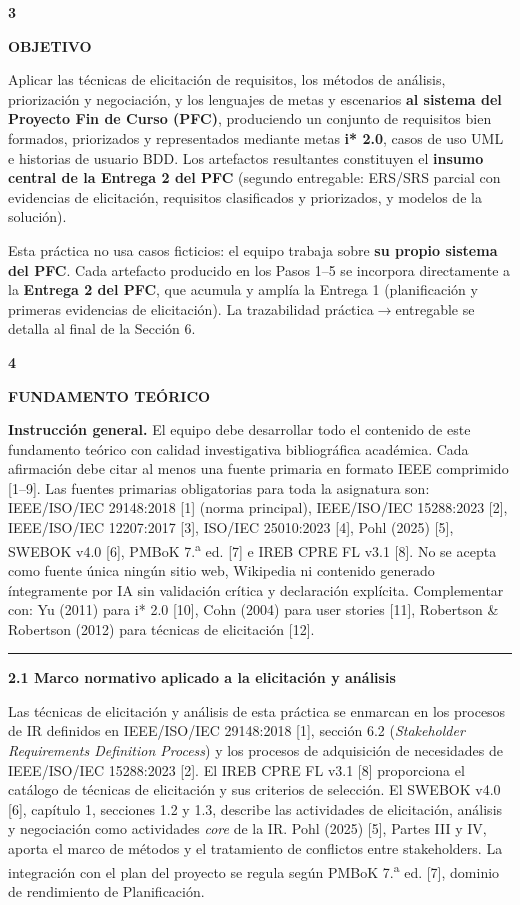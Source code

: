 \documentclass[11pt,a4paper]{article}
\newcommand{\secband}[2]{%
  \par\vspace{9pt}\noindent
  {\setlength{\fboxsep}{0pt}%
   \colorbox{secdark}{\parbox[c][20pt][c]{0.05\textwidth}{\centering\textbf{\color{white}\small #1}}}%
   \colorbox{secblue}{\parbox[c][20pt][c]{0.95\textwidth}{\hspace{8pt}\textbf{\color{white}\small #2}}}%
  }\par\vspace{5pt}}
\newcommand{\submark}[1]{\par\vspace{4pt}\noindent
  {\color{secblue}\rule[-1pt]{3.5pt}{12pt}}\hspace{6pt}\textbf{\color{secdark}#1}\par\vspace{2pt}}
\begin{document}
\secband{3}{OBJETIVO}
Aplicar las técnicas de elicitación de requisitos, los métodos de análisis, priorización y negociación, y los lenguajes de metas y escenarios \textbf{al sistema del Proyecto Fin de Curso (PFC)}, produciendo un conjunto de requisitos bien formados, priorizados y representados mediante metas \textbf{i* 2.0}, casos de uso UML e historias de usuario BDD. Los artefactos resultantes constituyen el \textbf{insumo central de la Entrega 2 del PFC} (segundo entregable: ERS/SRS parcial con evidencias de elicitación, requisitos clasificados y priorizados, y modelos de la solución).

\begin{notabox}[title={Vínculo con el Proyecto Fin de Curso — Entrega 2}]
\small Esta práctica no usa casos ficticios: el equipo trabaja sobre \textbf{su propio sistema del PFC}. Cada artefacto producido en los Pasos 1–5 se incorpora directamente a la \textbf{Entrega 2 del PFC}, que acumula y amplía la Entrega 1 (planificación y primeras evidencias de elicitación). La trazabilidad práctica$\rightarrow$entregable se detalla al final de la Sección 6.
\end{notabox}

\secband{4}{FUNDAMENTO TEÓRICO}
\textbf{Instrucción general.} El equipo debe desarrollar todo el contenido de este fundamento teórico con calidad investigativa bibliográfica académica. Cada afirmación debe citar al menos una fuente primaria en formato IEEE comprimido [1–9]. Las fuentes primarias obligatorias para toda la asignatura son: IEEE/ISO/IEC 29148:2018 [1] (norma principal), IEEE/ISO/IEC 15288:2023 [2], IEEE/ISO/IEC 12207:2017 [3], ISO/IEC 25010:2023 [4], Pohl (2025) [5], SWEBOK v4.0 [6], PMBoK 7.\textsuperscript{a} ed. [7] e IREB CPRE FL v3.1 [8]. No se acepta como fuente única ningún sitio web, Wikipedia ni contenido generado íntegramente por IA sin validación crítica y declaración explícita. Complementar con: Yu (2011) para i* 2.0 [10], Cohn (2004) para user stories [11], Robertson \& Robertson (2012) para técnicas de elicitación [12].

\submark{2.1 Marco normativo aplicado a la elicitación y análisis}
Las técnicas de elicitación y análisis de esta práctica se enmarcan en los procesos de IR definidos en IEEE/ISO/IEC 29148:2018 [1], sección 6.2 (\textit{Stakeholder Requirements Definition Process}) y los procesos de adquisición de necesidades de IEEE/ISO/IEC 15288:2023 [2]. El IREB CPRE FL v3.1 [8] proporciona el catálogo de técnicas de elicitación y sus criterios de selección. El SWEBOK v4.0 [6], capítulo 1, secciones 1.2 y 1.3, describe las actividades de elicitación, análisis y negociación como actividades \textit{core} de la IR. Pohl (2025) [5], Partes III y IV, aporta el marco de métodos y el tratamiento de conflictos entre stakeholders. La integración con el plan del proyecto se regula según PMBoK 7.\textsuperscript{a} ed. [7], dominio de rendimiento de Planificación.
\end{document}
